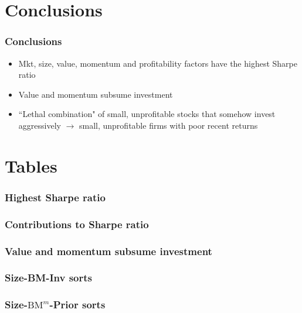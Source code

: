\documentclass{beamer}
\begin{document}
\section{Conclusions}

\begin{frame}
\frametitle{Conclusions}
\begin{itemize}
    \item<1-> Mkt, size, value, momentum and profitability factors have the
    highest Sharpe ratio
    \item<2-> Value and momentum subsume investment
    \item<3-> ``Lethal combination" of small, unprofitable stocks that somehow
    invest aggressively $\rightarrow$ small, unprofitable firms with poor
    recent returns
\end{itemize}
\end{frame}

\section{Tables}

\begin{frame}
\frametitle{Highest Sharpe ratio}
\resizebox{\linewidth}{!}{}
\end{frame}

\begin{frame}
\frametitle{Contributions to Sharpe ratio}
\begin{center}
\resizebox*{!}{\dimexpr\textheight-1.3cm\relax}{
    
    }
\end{center}
\end{frame}

\begin{frame}
\frametitle{Value and momentum subsume investment}
\begin{center}
\resizebox*{!}{\dimexpr\textheight-1.3cm\relax}{
    
    }
\end{center}
\end{frame}

\begin{frame}
\frametitle{Size-BM-Inv sorts}
\begin{center}
\resizebox*{!}{\dimexpr\textheight-1.3cm\relax}{
    
    }
\end{center}
\end{frame}
\begin{frame}
\frametitle{Size-$\text{BM}^m$-Prior sorts}
\begin{center}
\resizebox*{!}{\dimexpr\textheight-1.3cm\relax}{
    
    }
\end{center}
\end{frame}
\end{document}
